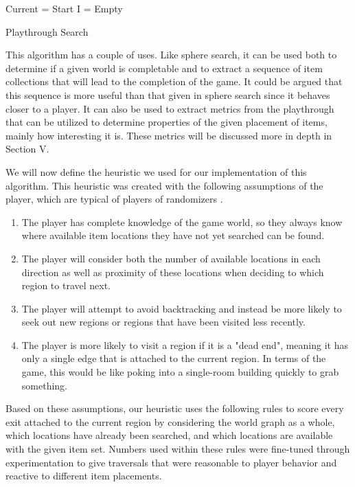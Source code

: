 \documentclass{ieeeaccess}
\begin{document}
\begin{algorithm}
\label{Alg7}
\SetAlgoLined
{}
    Current = Start\;
    I = Empty\;
 \caption{Playthrough Search}
\end{algorithm}

This algorithm has a couple of uses. Like sphere search, it can be used both to determine if a
given world is completable and to extract a sequence of item collections that will lead to the
completion of the game. It could be argued that this sequence is more useful than that given in
sphere search since it behaves closer to a player. It can also be used to extract metrics from
the playthrough that can be utilized to determine properties of the given placement of items,
mainly how interesting it is. These metrics will be discussed more in depth in Section V.

We will now define the heuristic we used for our implementation of this algorithm. This
heuristic was created with the following assumptions of the player, which are typical of
players of randomizers \cite{b12}.

\begin{enumerate}
    \item The player has complete knowledge of the game world, so they always know where
    available item locations they have not yet searched can be found.
    \item The player will consider both the number of available locations in each direction as
    well as proximity of these locations when deciding to which region to travel next.
    \item The player will attempt to avoid backtracking and instead be more likely to seek out
    new regions or regions that have been visited less recently.
    \item The player is more likely to visit a region if it is a "dead end", meaning it has
    only a single edge that is attached to the current region. In terms of the game, this would
    be like poking into a single-room building quickly to grab something.
\end{enumerate}

Based on these assumptions, our heuristic uses the following rules to score every exit attached
to the current region by considering the world graph as a whole, which locations have already
been searched, and which locations are available with the given item set. Numbers used within
these rules were fine-tuned through experimentation to give traversals that were reasonable to
player behavior and reactive to different item placements.
\end{document}
